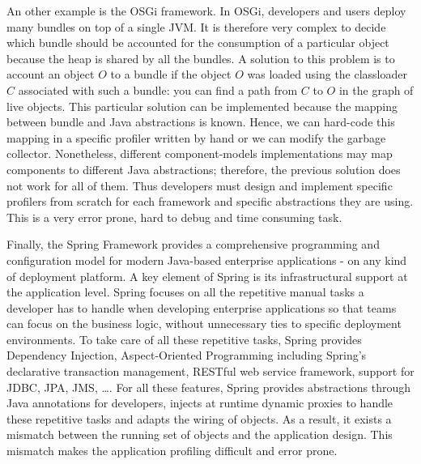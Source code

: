 An other example is the OSGi framework. 
In OSGi, developers and users deploy many bundles on top of a single JVM.
It is therefore very complex to decide which bundle should be accounted for the consumption of a particular object because the heap is shared by all the bundles.
A solution to this problem is to account an object $O$ to a bundle if the object $O$ was loaded using the classloader $C$ associated with such a bundle: you can find a path from $C$ to $O$ in the graph of live objects.
This particular solution can be implemented because the mapping between bundle and Java abstractions is known. 
Hence, we can hard-code this mapping in a specific profiler written by hand or we can modify the garbage collector.
Nonetheless, different component-models implementations may map components to different Java abstractions; therefore, the previous solution does not work for all of them.
Thus developers must design and implement specific profilers from scratch for each framework and specific abstractions they are using. 
This is a very error prone, hard to debug and time consuming task. 

Finally, the Spring Framework provides a comprehensive programming and configuration model for modern Java-based enterprise applications - on any kind of deployment platform. 
A key element of Spring is its infrastructural support at the application level.
Spring focuses on all the repetitive manual tasks a developer has to handle when developing enterprise applications so that teams can focus on the business logic, without unnecessary ties to specific deployment environments. 
To take care of all these repetitive tasks, Spring provides Dependency Injection, Aspect-Oriented Programming including Spring's declarative transaction management, RESTful web service framework, support for JDBC, JPA, JMS, \dots. 
For all these features, Spring provides abstractions through Java annotations for developers, injects at runtime dynamic proxies to handle these repetitive tasks and adapts the wiring of objects. 
As a result, it exists a mismatch between the running set of objects and the application design. 
This mismatch makes the application profiling difficult and error prone. 